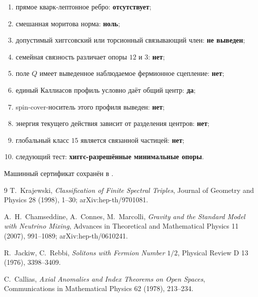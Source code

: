 \begin{protocol}
\begin{enumerate}
 \item прямое кварк-лептонное ребро: \textbf{отсутствует};
 \item смешанная моритова норма: \textbf{ноль};
 \item допустимый хиггсовский или торсионный связывающий член:
 \textbf{не выведен};
 \item семейная связность различает опоры $12$ и $3$: \textbf{нет};
 \item поле $Q$ имеет выведенное наблюдаемое фермионное сцепление:
 \textbf{нет};
 \item единый Каллиасов профиль условно даёт общий центр: \textbf{да};
 \item spin-cover-носитель этого профиля выведен: \textbf{нет};
 \item энергия текущего действия зависит от разделения центров:
 \textbf{нет};
 \item глобальный класс $15$ является связанной частицей: \textbf{нет};
 \item следующий тест: \textbf{хиггс-разрешённые минимальные опоры}.
\end{enumerate}
\end{protocol}

Машинный сертификат сохранён в
.

\begin{thebibliography}{9}
T.~Krajewski,
\emph{Classification of Finite Spectral Triples},
Journal of Geometry and Physics 28 (1998), 1--30;
arXiv:hep-th/9701081.

A.~H.~Chamseddine, A.~Connes, M.~Marcolli,
\emph{Gravity and the Standard Model with Neutrino Mixing},
Advances in Theoretical and Mathematical Physics 11 (2007), 991--1089;
arXiv:hep-th/0610241.

R.~Jackiw, C.~Rebbi,
\emph{Solitons with Fermion Number $1/2$},
Physical Review D 13 (1976), 3398--3409.

C.~Callias,
\emph{Axial Anomalies and Index Theorems on Open Spaces},
Communications in Mathematical Physics 62 (1978), 213--234.
\end{thebibliography}